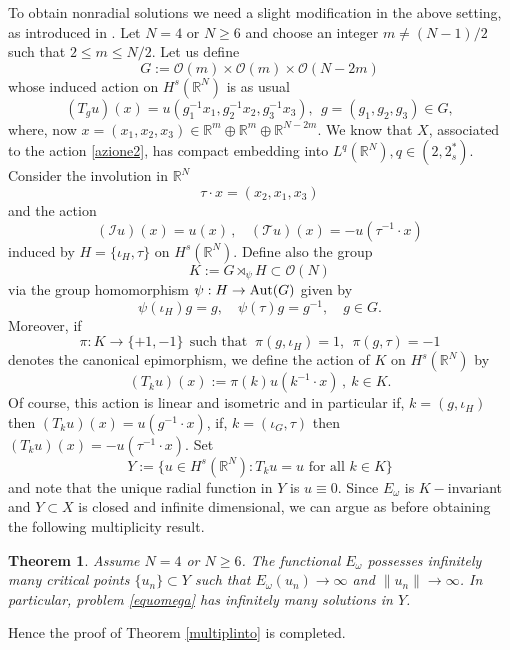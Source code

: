 \documentclass[10pt]{amsart}
\numberwithin{equation}{section}
\newtheorem{theorem}{Theorem}[section]
\begin{document}
\bigskip

\noindent
To obtain nonradial solutions we need a slight modification in the above setting,
as introduced in \cite{BW}.
Let $N=4$ or $N\geq6$ and choose an integer $m\neq (N-1)/2$ such that $2\leq m \leq N/2$. Let us define
$$
G:={{\mathscr O}}(m)\times {{\mathscr O}}(m)\times {{\mathscr O}}(N-2m)
$$
whose induced action on ${H^{s}(\mathbb R^{N})}$ is as usual
\begin{equation}\label{azione2}
(T_{g}u)(x)=u(g_{1}^{-1}x_{1},g_{2}^{-1}x_{2},g^{-1}_{3}x_{3}), \ \  g=(g_{1},g_{2},g_{3}) \in G,
\end{equation}
where, now
$x=(x_{1},x_{2},x_{3})\in \mathbb R^{m}\oplus\mathbb R^{m}\oplus\mathbb R^{N-2m}$.
We know that $X$, associated to the action \eqref{azione2}, has compact embedding into $L^{q}(\mathbb R^{N}),q\in(2,2^{*}_{s})$.
Consider the involution in $\mathbb R^{N}$ 
$$\tau\cdot x=(x_{2},x_{1},x_{3})$$
and the action  
\begin{equation*}\label{}
(\mathcal I u)(x)=u(x)\,, \ \ \ \ 
(\mathcal T u)(x)=-u(\tau^{-1}\cdot  x)
\end{equation*}
induced by  $H=\{\iota_{H},\tau \}$  on $H^{s}(\mathbb R^{N})$.
Define also the group 
$$
K:=G\rtimes_{\psi}H\subset {{\mathscr O}}(N)
$$
via the group homomorphism $\psi: H\to {\rm Aut}(G)$ given by $$\psi(\iota_{H})g=g, \quad \psi(\tau)g=g^{-1}, \quad g\in G.$$
Moreover, if 
$$\pi: K\to \{+1,-1\}\ \ \text{such that }\  \pi(g,\iota_{H})=1,  \ \ \pi(g,\tau)=-1$$
denotes the canonical epimorphism, we define the action of $K$  on $H^{s}(\mathbb R^{N})$ by
$$(T_{k}u)(x):=\pi(k)u(k^{-1}\cdot x)\,, \ k\in K.$$
Of course, this action is linear and isometric and in particular if, $k=(g,\iota_{H}) $ then $(T_{k}u)(x)=u(g^{-1} \cdot x)$, if, $k=(\iota_{G},\tau)$ then $(T_{k}u)(x)=-u(\tau^{-1} \cdot x).$
Set $$Y:=\{u\in {H^{s}(\mathbb R^{N})}: T_{k}u=u \text{ for all } k\in K\}$$
and note that the unique radial function in $Y$ is $u\equiv 0.$ 
Since $E_{\omega}$ is $K-$invariant and  $Y\subset X$ is closed and infinite dimensional, we can argue as before obtaining
the following multiplicity result.
\begin{theorem}
Assume $N=4$ or $N\geq6$. The functional $E_{\omega}$ 
possesses infinitely many critical points $\{u_{n}\}\subset Y$ such that $E_{\omega}(u_{n})\to \infty$ and $\|u_{n}\|\to \infty$.
In particular, problem \eqref{equomega} has  infinitely many solutions in $Y$.
\end{theorem}

\noindent Hence the proof of  Theorem \ref{multiplinto} is completed.
\end{document}
